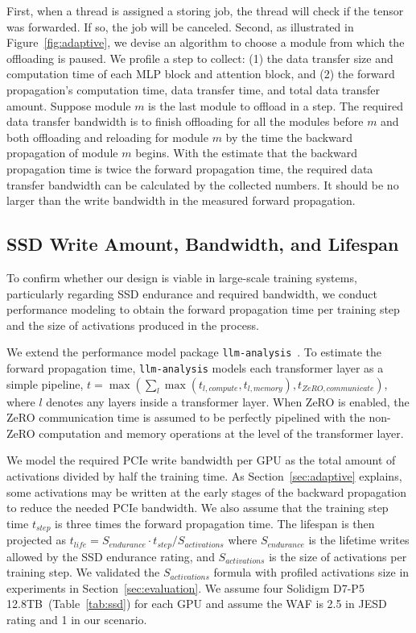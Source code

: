 First, when a thread is assigned a storing job, the thread will check if the tensor was forwarded. If so, the job will be canceled. Second, as illustrated in Figure~\ref{fig:adaptive}, we devise an algorithm to choose a module from which the offloading is paused. We profile a step to collect: (1) the data transfer size and computation time of each MLP block and attention block, and (2) the forward propagation's computation time, data transfer time, and total data transfer amount. Suppose module $m$ is the last module to offload in a step. The required data transfer bandwidth is to finish offloading for all the modules before $m$ and both offloading and reloading for module $m$ by the time the backward propagation of module $m$ begins. With the estimate that the backward propagation time is twice the forward propagation time, the required data transfer bandwidth can be calculated by the collected numbers. It should be no larger than the write bandwidth in the measured forward propagation.






\subsection{SSD Write Amount, Bandwidth, and Lifespan}
\label{sec:projected_life}
To confirm whether our design is viable in large-scale training systems, particularly regarding SSD endurance and required bandwidth, we conduct performance modeling to obtain the forward propagation time per training step and the size of activations produced in the process. 

We extend the performance model package \texttt{llm-analysis}~\cite{liLLMAnalysisLatencyMemory2023}.
To estimate the forward propagation time, \texttt{llm-analysis} models each transformer layer as a simple pipeline, 
$t= \max\left(\sum_{l}\max\left(t_{l,compute}, t_{l,memory}\right), t_{ZeRO,communicate}\right)$,
where $l$ denotes any layers inside a transformer layer. When ZeRO is enabled, the ZeRO communication time is assumed to be perfectly pipelined with the non-ZeRO computation and memory operations at the level of the transformer layer. 

 We model the required PCIe write bandwidth per GPU as the total amount of activations divided by half the training time. As Section~\ref{sec:adaptive} explains, some activations may be written at the early stages of the backward propagation to reduce the needed PCIe bandwidth. We also assume that the training step time $t_{step}$ is three times the forward propagation time. The lifespan is then projected as $t_{life} = S_{endurance}\cdot t_{step}/S_{activations}$ where $S_{endurance}$ is the lifetime writes allowed by the SSD endurance rating, and $S_{activations}$ is the size of activations per training step. We validated the $S_{activations}$ formula with profiled activations size in experiments in Section~\ref{sec:evaluation}. We assume four Solidigm D7-P5 12.8TB~(Table~\ref{tab:ssd}) for each GPU and assume the WAF is 2.5 in JESD rating and 1 in our scenario.


